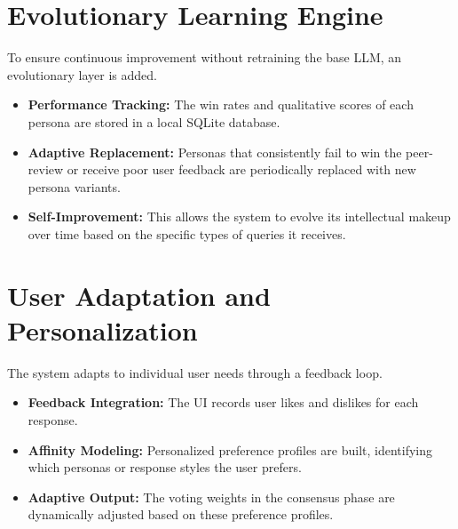 \section{Evolutionary Learning Engine}

To ensure continuous improvement without retraining the base LLM, an evolutionary layer is added.

\begin{itemize}
    \item \textbf{Performance Tracking:} The win rates and qualitative scores of each persona are stored in a local SQLite database.
    
    \item \textbf{Adaptive Replacement:} Personas that consistently fail to win the peer-review or receive poor user feedback are periodically replaced with new persona variants.
    
    \item \textbf{Self-Improvement:} This allows the system to evolve its intellectual makeup over time based on the specific types of queries it receives.
\end{itemize}

\section{User Adaptation and Personalization}

The system adapts to individual user needs through a feedback loop.

\begin{itemize}
    \item \textbf{Feedback Integration:} The UI records user likes and dislikes for each response.
    
    \item \textbf{Affinity Modeling:} Personalized preference profiles are built, identifying which personas or response styles the user prefers.
    
    \item \textbf{Adaptive Output:} The voting weights in the consensus phase are dynamically adjusted based on these preference profiles.
\end{itemize}
